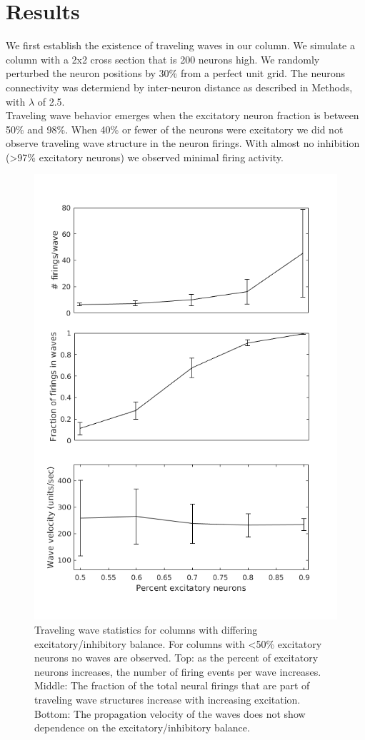 \documentclass[a4paper,11pt]{article}
\begin{document}
\section{Results}
We first establish the existence of traveling waves in our column.
We simulate a column with a 2x2 cross section that is 200 neurons high.
We randomly perturbed the neuron positions by 30\% from a perfect unit grid.
The neurons connectivity was determiend by inter-neuron distance as described in Methods, with $\lambda$ of 2.5.
\\
Traveling wave behavior emerges when the excitatory neuron fraction is between 50\% and 98\%.
When 40\% or fewer of the neurons were excitatory we did not observe traveling wave structure in the neuron firings.
With almost no inhibition (>97\% excitatory neurons) we observed minimal firing activity.
\begin{figure}[ht]
 \caption{Traveling wave statistics for columns with differing excitatory/inhibitory balance. 
	  For columns with <50\% excitatory neurons no waves are observed. 
	  Top: as the percent of excitatory neurons increases, the number of firing events per wave increases. 
	  Middle: The fraction of the total neural firings that are part of traveling wave structures increase with increasing excitation.
	  Bottom: The propagation velocity of the waves does not show dependence on the excitatory/inhibitory balance.}
 \label{fig:excitatory_effect}
 \centering
   \includegraphics[width=\textwidth]{fig/ExcitatoryWaves}
\end{figure}
\end{document}
